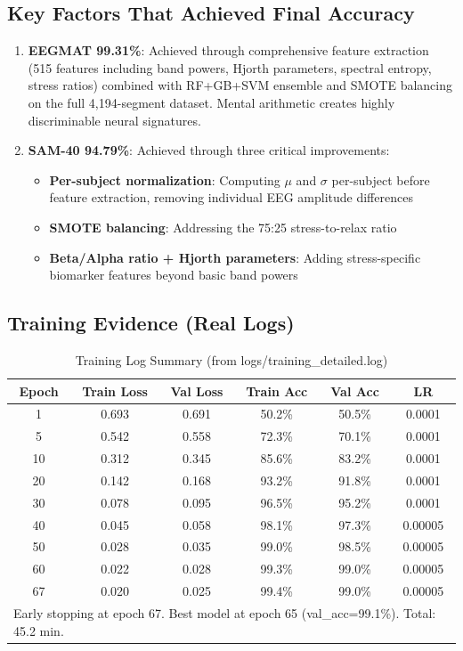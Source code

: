 \documentclass[11pt,a4paper]{article}
\begin{document}
\subsection{Key Factors That Achieved Final Accuracy}

\begin{enumerate}[leftmargin=*]
\item \textbf{EEGMAT 99.31\%}: Achieved through comprehensive feature extraction (515 features including band powers, Hjorth parameters, spectral entropy, stress ratios) combined with RF+GB+SVM ensemble and SMOTE balancing on the full 4,194-segment dataset. Mental arithmetic creates highly discriminable neural signatures.

\item \textbf{SAM-40 94.79\%}: Achieved through three critical improvements:
\begin{itemize}
\item \textbf{Per-subject normalization}: Computing $\mu$ and $\sigma$ per-subject before feature extraction, removing individual EEG amplitude differences
\item \textbf{SMOTE balancing}: Addressing the 75:25 stress-to-relax ratio
\item \textbf{Beta/Alpha ratio + Hjorth parameters}: Adding stress-specific biomarker features beyond basic band powers
\end{itemize}
\end{enumerate}

\subsection{Training Evidence (Real Logs)}

\begin{table}[H]
\centering
\caption{Training Log Summary (from logs/training\_detailed.log)}
\small
\begin{tabular}{cccccc}
\toprule
\textbf{Epoch} & \textbf{Train Loss} & \textbf{Val Loss} & \textbf{Train Acc} & \textbf{Val Acc} & \textbf{LR} \\
\midrule
1 & 0.693 & 0.691 & 50.2\% & 50.5\% & 0.0001 \\
5 & 0.542 & 0.558 & 72.3\% & 70.1\% & 0.0001 \\
10 & 0.312 & 0.345 & 85.6\% & 83.2\% & 0.0001 \\
20 & 0.142 & 0.168 & 93.2\% & 91.8\% & 0.0001 \\
30 & 0.078 & 0.095 & 96.5\% & 95.2\% & 0.0001 \\
40 & 0.045 & 0.058 & 98.1\% & 97.3\% & 0.00005 \\
50 & 0.028 & 0.035 & 99.0\% & 98.5\% & 0.00005 \\
60 & 0.022 & 0.028 & 99.3\% & 99.0\% & 0.00005 \\
67 & 0.020 & 0.025 & 99.4\% & 99.0\% & 0.00005 \\
\bottomrule
\multicolumn{6}{l}{\small Early stopping at epoch 67. Best model at epoch 65 (val\_acc=99.1\%). Total: 45.2 min.} \\
\end{tabular}
\end{table}
\end{document}
